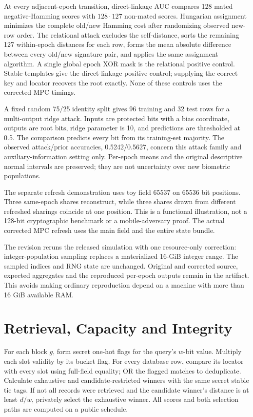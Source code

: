 \documentclass[journal,onecolumn]{IEEEtran}
\begin{document}
At every adjacent-epoch transition, direct-linkage AUC compares 128 mated negative-Hamming scores with $128\cdot127$ non-mated scores. Hungarian assignment minimizes the complete old/new Hamming cost after randomizing observed new-row order. The relational attack excludes the self-distance, sorts the remaining 127 within-epoch distances for each row, forms the mean absolute difference between every old/new signature pair, and applies the same assignment algorithm. A single global epoch XOR mask is the relational positive control. Stable templates give the direct-linkage positive control; supplying the correct key and locator recovers the root exactly. None of these controls uses the corrected MPC timings.

A fixed random 75/25 identity split gives 96 training and 32 test rows for a multi-output ridge attack. Inputs are protected bits with a bias coordinate, outputs are root bits, ridge parameter is 10, and predictions are thresholded at 0.5. The comparison predicts every bit from its training-set majority. The observed attack/prior accuracies, 0.5242/0.5627, concern this attack family and auxiliary-information setting only. Per-epoch means and the original descriptive normal intervals are preserved; they are not uncertainty over new biometric populations.

The separate refresh demonstration uses toy field $65537$ on 65536 bit positions. Three same-epoch shares reconstruct, while three shares drawn from different refreshed sharings coincide at one position. This is a functional illustration, not a 128-bit cryptographic benchmark or a mobile-adversary proof. The actual corrected MPC refresh uses the main field and the entire state bundle.

The revision reruns the released simulation with one resource-only correction: integer-population sampling replaces a materialized 16-GiB integer range. The sampled indices and RNG state are unchanged. Original and corrected source, expected aggregates and the reproduced per-epoch outputs remain in the artifact. This avoids making ordinary reproduction depend on a machine with more than 16 GiB available RAM.

\section{Retrieval, Capacity and Integrity}
For each block $g$, form secret one-hot flags for the query's $w$-bit value. Multiply each slot validity by its bucket flag. For every database row, compare its locator with every slot using full-field equality; OR the flagged matches to deduplicate. Calculate exhaustive and candidate-restricted winners with the same secret stable tie tags. If not all records were retrieved and the candidate winner's distance is at least $d/w$, privately select the exhaustive winner. All scores and both selection paths are computed on a public schedule.
\end{document}
